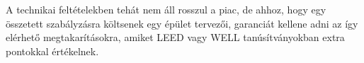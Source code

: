 A technikai feltételekben tehát nem áll rosszul a piac, de ahhoz, hogy egy összetett szabályzásra költsenek egy épület tervezői, garanciát kellene adni az így elérhető megtakarításokra, amiket LEED vagy WELL tanúsítványokban extra pontokkal értékelnek.

